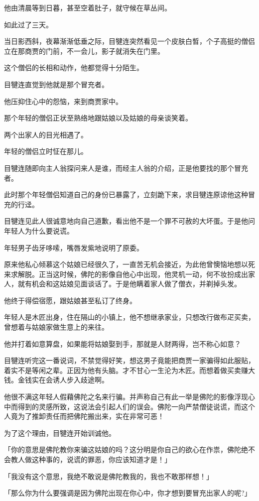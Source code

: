 \documentclass[twoside,openany]{book}
\begin{document}
他由清晨等到日暮，甚至空着肚子，就守候在草丛间。

如此过了三天。

当日影西斜，夜幕渐渐低垂之际，目犍连突然看见一个皮肤白晳，个子高挺的僧侣立在那商贾的门前，不一会儿，影子就消失在门里。

这个僧侣的长相和动作，他都觉得十分陌生。

目犍连直觉到他就是那个冒充者。

他压抑住心中的怨恼，来到商贾家中。

那个年轻的僧侣正状至熟络地跟姑娘以及姑娘的母亲谈笑着。

两个出家人的目光相遇了。

年轻的僧侣立时怔在那儿。

目犍连随即向主人翁探问来人是谁，而经主人翁的介绍，正是他要找的那个冒充者。

此时那个年轻僧侣知道自己的身份已暴露了，立刻跪下来，求目犍连原谅他这种冒充的行迳。

目犍连见此人很诚意地向自己道歉，看出他不是一个罪不可赦的大坏蛋。于是他问年轻人为什么要说谎。

年轻男子齿牙哆嗦，嘴唇发紫地说明了原委。

原来他私心倾慕这个姑娘已经很久了，一直苦无机会接近，为此他曾懊恼地想以死来求解脱。正当这时候，佛陀的影像自他心中出现，他灵机一动，何不妆扮成出家人，就有机会和这姑娘见面谈话了。于是他瞒着家人做了僧衣，并剃掉头发。

他终于得偿宿愿，跟姑娘甚至私订了终身。

年轻人是木匠出身，住在隔山的小镇上，他不想继承家业，只想改行做布疋买卖，曾想着与姑娘家做生意上的来往。

他并打着如意算盘，如果能将姑娘娶到手，那就是人财两得，岂不称心如意？

目犍连听完这一番说词，不禁觉得好笑，想这男子竟能把商贾一家骗得如此服贴，着实不是等闲之辈。正因为他有头脑。才不甘心一生沦为木匠。而想着做买卖赚大钱。金钱实在会诱人步入歧途啊。

他很不满这年轻人假藉佛陀之名来行骗。并声称自己有此一举是佛陀的影像浮现心中而得到的灵感所致，这说法会引起人们的误会。佛陀一向严禁僧徒说谎，而这个人竟为了推卸责任而把佛陀搬出来，实在非常可恶！

为了这个理由，目犍连开始训诚他。

「你的意思是佛陀教你来骗这姑娘的吗？这分明是你自己的欲心在作祟，佛陀绝不会教人做这种事的，说谎的罪恶，你应该知道才是！」

「我没有这个意思，我绝不敢说是佛陀教我的，我也不敢那样想！」

「那么你为什么要强调是因为佛陀出现在你心中，你才想到要冒充出家人的呢?」
\end{document}
